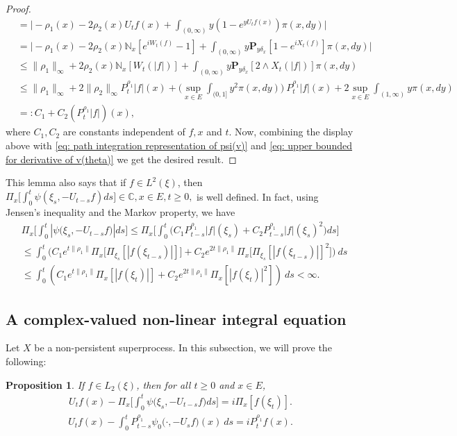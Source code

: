 \documentclass[12pt,a4paper]{amsart}
\theoremstyle{plain}
\newtheorem{prop}[thm]{Proposition}
\theoremstyle{definition}
\numberwithin{equation}{section}
\begin{document}
\begin{proof}
\begin{align}
    & = \Big| -\rho_1(x)- 2\rho_2(x) U_tf(x)+ \int_{(0,\infty)} y (1- e^{y U_tf(x)} ) \pi(x,dy)\Big| \\
    & = \Big| - \rho_1(x)- 2\rho_2(x)\mathbb N_x[e^{i W_t(f)} - 1]  + \int_{(0,\infty)} y \mathbf P_{y \delta_x}[1-e^{i X_t(f)}] \pi(x,dy) \Big| \\
    & \leq \|\rho_1\|_\infty + 2\rho_2(x)\mathbb N_x[W_t(|f|)]+ \int_{(0,\infty)} y\mathbf P_{y\delta_x}[2\wedge X_t(|f|)] \pi(x,dy) \\
    & \leq \|\rho_1\|_\infty + 2\|\rho_2\|_\infty P^{\rho_1}_t |f|(x) + \Big(\sup_{x\in E}\int_{(0,1]}y^2 \pi(x,dy)\Big)~P^{\rho_1}_t |f|(x) + 2\sup_{x\in E}\int_{(1,\infty)} y \pi(x,dy) \\
    & =: C_1 + C_2(P^{\rho_1}_t |f|)(x), \label{eq: upper bound of psi'(v)}
  \end{align}
where $C_1, C_2$ are constants independent of $f,x$ and $t$.
  Now, combining the display above with \eqref{eq: path integration representation of psi(v)} and \eqref{eq: upper bounded for derivative of v(theta)} we get the desired result.
\end{proof}

This lemma also says that if $f\in L^2(\xi)$, then
$
  \Pi_x\Big[\int_0^t \psi(\xi_s,- U_{t-s}f)ds\Big]
  \in \mathbb C,
 x\in E, t\geq 0,$
is well defined.
In fact, using Jensen's inequality and the Markov property, we have
\begin{align}
  \label{eq: domination of psi(v)}
  & \Pi_x\Big[\int_0^t |\psi \big(\xi_s,-U_{t-s}f\big)|ds\Big]
  \leq \Pi_x\Big[\int_0^t \big(C_1 P_{t-s}^{\rho_1}|f|(\xi_s)+C_2 P_{t-s}^{\rho_1}|f|(\xi_s)^2\big)ds\Big] \\
  & \leq \int_0^t \big(C_1 e^{t\|\rho_1\|}\Pi_x \big[ \Pi_{\xi_s}[|f(\xi_{t-s})|] \big]+C_2 e^{2t\|\rho_1\|}\Pi_x \big[ \Pi_{\xi_s}[|f (\xi_{t-s})|]^2 \big]\big)~ds \\
  & \leq \int_0^t (C_1 e^{t\|\rho_1\|}\Pi_x [ |f(\xi_{t})|]+C_2e^{2t\|\rho_1\|}\Pi_x [ |f (\xi_{t})|^2 ])~ds < \infty.
\end{align}

\subsection{A complex-valued non-linear integral equation}
Let $X$ be a non-persistent superprocess.
In this subsection, we will prove the following:

\begin{prop}
  \label{prop: complex FKPP-equation}
  If $f\in L_2(\xi)$,  then for all $t\geq 0$ and $x\in E$,
\begin{align}
  \label{eq: complex FKPP-equation}
  U_tf(x) - \Pi_x \Big[\int_0^t \psi\big(\xi_s, - U_{t-s}f\big) ds \Big]
  = i \Pi_x [f(\xi_t)].
\end{align}
\begin{align}
  \label{eq: complex FKPP-equation with FK-transform}
  U_tf(x) -  \int_0^t P_{t-s}^{\rho_1} \psi_0\big(\cdot,-U_sf\big) (x)~ds
  = iP_t^{\rho_1} f(x).
\end{align}
\end{prop}
\end{document}
